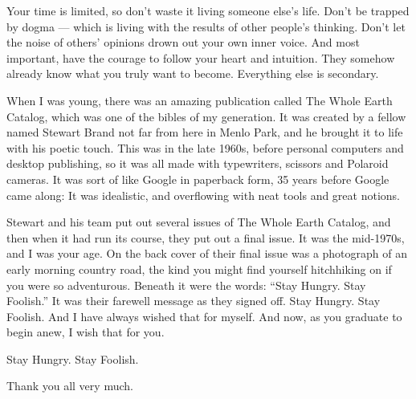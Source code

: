 \documentclass{ltjsarticle}
\begin{document}
Your time is limited, so don’t waste it living someone else’s life. Don’t be trapped by dogma — which is living with the results of other people’s thinking. Don’t let the noise of others’ opinions drown out your own inner voice. And most important, have the courage to follow your heart and intuition. They somehow already know what you truly want to become. Everything else is secondary.

When I was young, there was an amazing publication called The Whole Earth Catalog, which was one of the bibles of my generation. It was created by a fellow named Stewart Brand not far from here in Menlo Park, and he brought it to life with his poetic touch. This was in the late 1960s, before personal computers and desktop publishing, so it was all made with typewriters, scissors and Polaroid cameras. It was sort of like Google in paperback form, 35 years before Google came along: It was idealistic, and overflowing with neat tools and great notions.

Stewart and his team put out several issues of The Whole Earth Catalog, and then when it had run its course, they put out a final issue. It was the mid-1970s, and I was your age. On the back cover of their final issue was a photograph of an early morning country road, the kind you might find yourself hitchhiking on if you were so adventurous. Beneath it were the words: “Stay Hungry. Stay Foolish.” It was their farewell message as they signed off. Stay Hungry. Stay Foolish. And I have always wished that for myself. And now, as you graduate to begin anew, I wish that for you.

Stay Hungry. Stay Foolish.

Thank you all very much.
\end{document}
